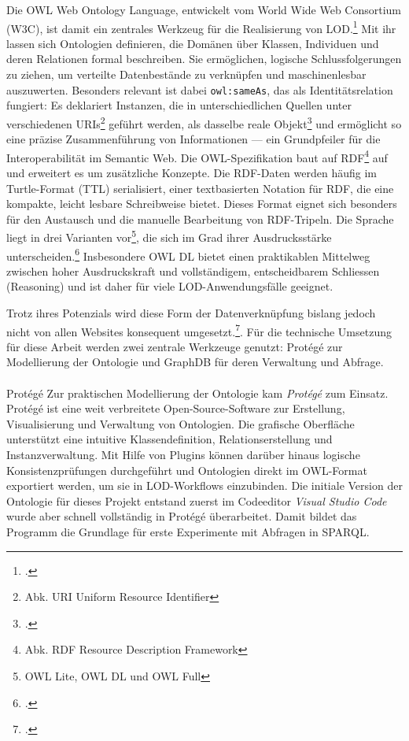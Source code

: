 \documentclass[12pt, a4paper, ngerman, bidi=default]{article}
\makeatletter
\let\cite\footcite
\let\oldparagraph\paragraph%
\renewcommand{\paragraph}{
    \@ifstar%
      \xxxParagraphStar%
      \xxxParagraphNoStar%
 }
\newcommand{\xxxParagraphStar}[1]{\oldparagraph*{#1}\mbox{}}
\newcommand{\xxxParagraphNoStar}[1]{\oldparagraph{#1}\mbox{}}
\makeatother
\begin{document}
Die OWL Web Ontology Language, entwickelt vom World Wide Web Consortium (W3C), ist damit ein zentrales Werkzeug für die Realisierung von 
LOD.\cite[ vgl.][]{smith_owl_2004} 
Mit ihr lassen sich Ontologien definieren, die Domänen über Klassen, Individuen und deren Relationen formal beschreiben. 
Sie ermöglichen, logische Schlussfolgerungen zu ziehen, um verteilte Datenbestände zu verknüpfen und maschinenlesbar auszuwerten.
Besonders relevant ist dabei \texttt{owl:sameAs}, das als Identitätsrelation fungiert: 
Es deklariert Instanzen, die in unterschiedlichen Quellen unter verschiedenen URIs\footnote{Abk. URI\: Uniform Resource Identifier} geführt werden, 
als dasselbe reale Objekt\cite[ vgl.][2.3. Data Aggregation and Privacy]{smith_owl_2004}
und ermöglicht so eine präzise Zusammenführung von Informationen — ein Grundpfeiler für die Interoperabilität im Semantic Web.
Die OWL-Spezifikation baut auf RDF\footnote{Abk. RDF\; Resource Description Framework} auf und erweitert es um zusätzliche Konzepte.
Die RDF-Daten werden häufig im Turtle-Format (TTL) serialisiert, einer textbasierten Notation für RDF, die eine kompakte, leicht lesbare Schreibweise bietet.
Dieses Format eignet sich besonders für den Austausch und die manuelle Bearbeitung von RDF-Tripeln.
Die Sprache liegt in drei Varianten vor\footnote{OWL Lite, OWL DL und OWL Full}, die sich im Grad ihrer Ausdrucksstärke 
unterscheiden.\cite[ vgl.][1.1. The Species of OWL.]{smith_owl_2004}
Insbesondere OWL DL bietet einen praktikablen Mittelweg zwischen hoher Ausdruckskraft und vollständigem, entscheidbarem Schliessen (Reasoning) 
und ist daher für viele LOD-Anwendungsfälle geeignet.

Trotz ihres Potenzials wird diese Form der Datenverknüpfung bislang jedoch nicht von allen Websites konsequent 
umgesetzt.\cite[ vgl.][S. 14]{garoufallou_metadata_2020}. Für die technische 
Umsetzung für diese Arbeit werden zwei zentrale Werkzeuge genutzt: Protégé zur Modellierung der Ontologie und GraphDB für deren Verwaltung und Abfrage.

\paragraph{Protégé} Zur praktischen Modellierung der Ontologie kam \textit{Protégé} zum Einsatz. 
Protégé ist eine weit verbreitete Open-Source-Software zur Erstellung, Visualisierung und Verwaltung von Ontologien.
Die grafische Oberfläche unterstützt eine intuitive Klassendefinition, 
Relationserstellung und Instanzverwaltung. 
Mit Hilfe von Plugins können darüber hinaus logische Konsistenzprüfungen durchgeführt und 
Ontologien direkt im OWL-Format exportiert werden, um sie in LOD-Workflows einzubinden.
Die initiale Version der Ontologie für dieses Projekt entstand zuerst im Codeeditor \textit{Visual Studio Code} wurde aber schnell vollständig in Protégé überarbeitet.
Damit bildet das Programm die Grundlage für erste Experimente mit Abfragen in SPARQL.
\end{document}

